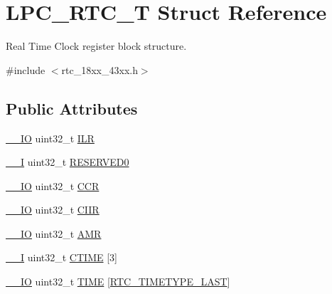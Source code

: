\hypertarget{struct_l_p_c___r_t_c___t}{}\section{L\+P\+C\+\_\+\+R\+T\+C\+\_\+T Struct Reference}
\label{struct_l_p_c___r_t_c___t}


Real Time Clock register block structure.  




{\ttfamily \#include $<$rtc\+\_\+18xx\+\_\+43xx.\+h$>$}

\subsection*{Public Attributes}
\begin{DoxyCompactItemize}
\item 
\hyperlink{core__sc300_8h_aec43007d9998a0a0e01faede4133d6be}{\+\_\+\+\_\+\+IO} uint32\+\_\+t \hyperlink{struct_l_p_c___r_t_c___t_a6e1debaa7074a0fae4767a70f9abff29}{I\+LR}
\item 
\hyperlink{core__sc300_8h_af63697ed9952cc71e1225efe205f6cd3}{\+\_\+\+\_\+I} uint32\+\_\+t \hyperlink{struct_l_p_c___r_t_c___t_a94d0c8bf3402d34aac9170bac01bb4fb}{R\+E\+S\+E\+R\+V\+E\+D0}
\item 
\hyperlink{core__sc300_8h_aec43007d9998a0a0e01faede4133d6be}{\+\_\+\+\_\+\+IO} uint32\+\_\+t \hyperlink{struct_l_p_c___r_t_c___t_ab2117371a628879dbc56f2c1774207b5}{C\+CR}
\item 
\hyperlink{core__sc300_8h_aec43007d9998a0a0e01faede4133d6be}{\+\_\+\+\_\+\+IO} uint32\+\_\+t \hyperlink{struct_l_p_c___r_t_c___t_ac9d2627afcf203dccde2675c6c74d673}{C\+I\+IR}
\item 
\hyperlink{core__sc300_8h_aec43007d9998a0a0e01faede4133d6be}{\+\_\+\+\_\+\+IO} uint32\+\_\+t \hyperlink{struct_l_p_c___r_t_c___t_af8b21ae5aa8bedcb0a1dd918678ee389}{A\+MR}
\item 
\hyperlink{core__sc300_8h_af63697ed9952cc71e1225efe205f6cd3}{\+\_\+\+\_\+I} uint32\+\_\+t \hyperlink{struct_l_p_c___r_t_c___t_a66b166ccd4abefe149e6e3ef6d833554}{C\+T\+I\+ME} \mbox{[}3\mbox{]}
\item 
\hyperlink{core__sc300_8h_aec43007d9998a0a0e01faede4133d6be}{\+\_\+\+\_\+\+IO} uint32\+\_\+t \hyperlink{struct_l_p_c___r_t_c___t_adb4fbf67e8231188ed424c3ce226919e}{T\+I\+ME} \mbox{[}\hyperlink{group___r_t_c__18_x_x__43_x_x_gga8144898fe628404d396db06dc8aac0e0a0d4fafef57b6ef363f9a0875ff339cad}{R\+T\+C\+\_\+\+T\+I\+M\+E\+T\+Y\+P\+E\+\_\+\+L\+A\+ST}\mbox{]}

\end{DoxyCompactItemize}

